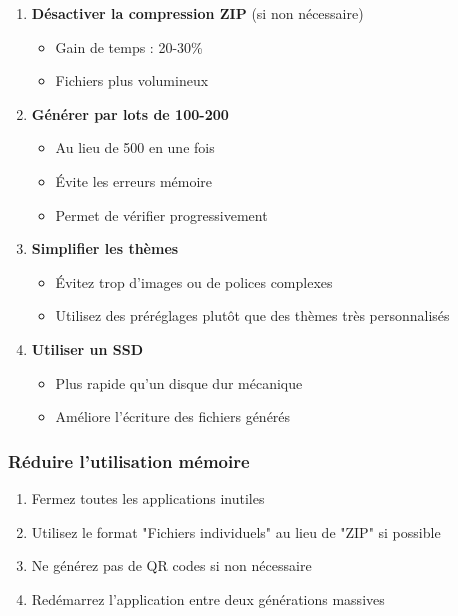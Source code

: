 \begin{enumerate}[leftmargin=*]
    \item \textbf{Désactiver la compression ZIP} (si non nécessaire)
    \begin{itemize}
        \item Gain de temps : 20-30\%
        \item Fichiers plus volumineux
    \end{itemize}

    \item \textbf{Générer par lots de 100-200}
    \begin{itemize}
        \item Au lieu de 500 en une fois
        \item Évite les erreurs mémoire
        \item Permet de vérifier progressivement
    \end{itemize}

    \item \textbf{Simplifier les thèmes}
    \begin{itemize}
        \item Évitez trop d'images ou de polices complexes
        \item Utilisez des préréglages plutôt que des thèmes très personnalisés
    \end{itemize}

    \item \textbf{Utiliser un SSD}
    \begin{itemize}
        \item Plus rapide qu'un disque dur mécanique
        \item Améliore l'écriture des fichiers générés
    \end{itemize}
\end{enumerate}

\subsubsection{Réduire l'utilisation mémoire}

\begin{enumerate}[leftmargin=*]
    \item Fermez toutes les applications inutiles
    \item Utilisez le format "Fichiers individuels" au lieu de "ZIP" si possible
    \item Ne générez pas de QR codes si non nécessaire
    \item Redémarrez l'application entre deux générations massives
\end{enumerate}

